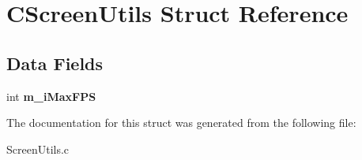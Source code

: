 \hypertarget{struct_c_screen_utils}{}\section{C\+Screen\+Utils Struct Reference}
\label{struct_c_screen_utils}
\subsection*{Data Fields}
\begin{DoxyCompactItemize}
\item 
\mbox{\label{struct_c_screen_utils_a68ef5908fd585203aa4dc0310d648cbe}} 
int {\bfseries m\+\_\+i\+Max\+F\+PS}
\end{DoxyCompactItemize}


The documentation for this struct was generated from the following file\+:\begin{DoxyCompactItemize}
\item 
Screen\+Utils.\+c\end{DoxyCompactItemize}
